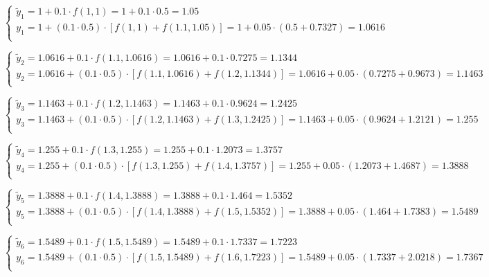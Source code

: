 \documentclass[10pt, a4paper]{scrartcl}
\begin{document}
\(\displaystyle \begin{cases} \tilde{y}_{1} = 1 + 0.1 \cdot f(1, 1) = 1 + 0.1 \cdot 0.5 = 1.05\\ y_{1} = 1 + (0.1\cdot 0.5) \cdot [f(1, 1) + f(1.1, 1.05)] = 1 + 0.05 \cdot (0.5 + 0.7327) = 1.0616\\ \end{cases}\)

\(\displaystyle \begin{cases} \tilde{y}_{2} = 1.0616 + 0.1 \cdot f(1.1, 1.0616) = 1.0616 + 0.1 \cdot 0.7275 = 1.1344\\ y_{2} = 1.0616 + (0.1\cdot 0.5) \cdot [f(1.1, 1.0616) + f(1.2, 1.1344)] = 1.0616 + 0.05 \cdot (0.7275 + 0.9673) = 1.1463\\ \end{cases}\)

\(\displaystyle \begin{cases} \tilde{y}_{3} = 1.1463 + 0.1 \cdot f(1.2, 1.1463) = 1.1463 + 0.1 \cdot 0.9624 = 1.2425\\ y_{3} = 1.1463 + (0.1\cdot 0.5) \cdot [f(1.2, 1.1463) + f(1.3, 1.2425)] = 1.1463 + 0.05 \cdot (0.9624 + 1.2121) = 1.255\\ \end{cases}\)

\(\displaystyle \begin{cases} \tilde{y}_{4} = 1.255 + 0.1 \cdot f(1.3, 1.255) = 1.255 + 0.1 \cdot 1.2073 = 1.3757\\ y_{4} = 1.255 + (0.1\cdot 0.5) \cdot [f(1.3, 1.255) + f(1.4, 1.3757)] = 1.255 + 0.05 \cdot (1.2073 + 1.4687) = 1.3888\\ \end{cases}\)

\(\displaystyle \begin{cases} \tilde{y}_{5} = 1.3888 + 0.1 \cdot f(1.4, 1.3888) = 1.3888 + 0.1 \cdot 1.464 = 1.5352\\ y_{5} = 1.3888 + (0.1\cdot 0.5) \cdot [f(1.4, 1.3888) + f(1.5, 1.5352)] = 1.3888 + 0.05 \cdot (1.464 + 1.7383) = 1.5489\\ \end{cases}\)

\(\displaystyle \begin{cases} \tilde{y}_{6} = 1.5489 + 0.1 \cdot f(1.5, 1.5489) = 1.5489 + 0.1 \cdot 1.7337 = 1.7223\\ y_{6} = 1.5489 + (0.1\cdot 0.5) \cdot [f(1.5, 1.5489) + f(1.6, 1.7223)] = 1.5489 + 0.05 \cdot (1.7337 + 2.0218) = 1.7367\\ \end{cases}\)
\end{document}
